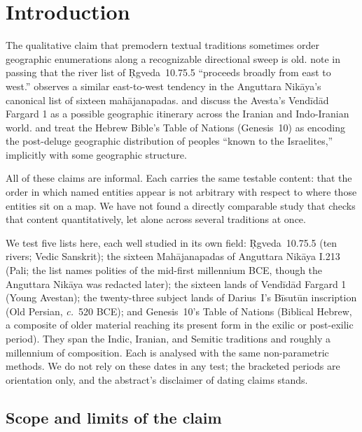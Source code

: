 \documentclass[11pt]{article}
\begin{document}
\section{Introduction}\label{sec:intro}

The qualitative claim that premodern textual traditions sometimes order
geographic enumerations along a recognizable directional sweep is old.
\citet{macdonell-keith1912} note in passing that the river list of
\d{R}gveda~10.75.5 ``proceeds broadly from east to west.''
\citet{rhysdavids1903} observes a similar east-to-west tendency in
the Anguttara Nikāya's canonical list of sixteen mahājanapadas.
\citet{gnoli1980} and \citet{witzel2000homeland} discuss the Avesta's
Vendīdād Fargard 1 as a possible geographic itinerary across the
Iranian and Indo-Iranian world. \citet{westermann1984} and
\citet{wenham1987} treat the Hebrew Bible's Table of Nations
(Genesis~10) as encoding the post-deluge geographic distribution of
peoples ``known to the Israelites,'' implicitly with some geographic
structure.

All of these claims are informal. Each carries the same testable
content: that the order in which named entities appear is not
arbitrary with respect to where those entities sit on a map. We have
not found a directly comparable study that checks that content
quantitatively, let alone across several traditions at once.

We test five lists here, each well studied in its own field:
\d{R}gveda~10.75.5 (ten rivers; Vedic Sanskrit); the sixteen
Mahājanapadas of Anguttara Nikāya I.213 (Pali; the list names
polities of the mid-first millennium BCE, though the Anguttara
Nikāya was redacted later); the sixteen lands of Vendīdād Fargard 1
(Young Avestan); the twenty-three subject lands of Darius~I's
Bīsutūn inscription (Old Persian, \textit{c.}\ 520 BCE); and
Genesis~10's Table of Nations (Biblical Hebrew, a composite of older
material reaching its present form in the exilic or post-exilic
period). They span the Indic, Iranian, and Semitic traditions and
roughly a millennium of composition. Each is analysed with the same
non-parametric methods. We do not rely on these dates in any test;
the bracketed periods are orientation only, and the abstract's
disclaimer of dating claims stands.

\subsection{Scope and limits of the claim}\label{sec:scope}
\end{document}

